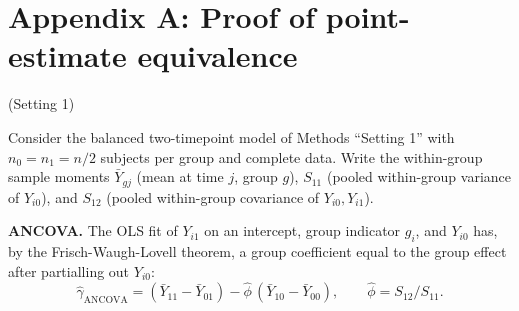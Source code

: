 \documentclass[
  11pt,
]{article}
\begin{document}
\section{Appendix A: Proof of point-estimate equivalence}\label{appendix-a-proof-of-point-estimate-equivalence}

(Setting 1)

Consider the balanced two-timepoint model of Methods
``Setting 1'' with \(n_0 = n_1 = n/2\) subjects per group and
complete data. Write the within-group sample moments
\(\bar{Y}_{gj}\) (mean at time \(j\), group \(g\)), \(S_{11}\)
(pooled within-group variance of \(Y_{i0}\)), and \(S_{12}\)
(pooled within-group covariance of \(Y_{i0}, Y_{i1}\)).

\textbf{ANCOVA.} The OLS fit of \(Y_{i1}\) on an intercept,
group indicator \(g_i\), and \(Y_{i0}\) has, by the
Frisch-Waugh-Lovell theorem, a group coefficient equal to
the group effect after partialling out \(Y_{i0}\):
\[
\hat{\gamma}_{\mathrm{ANCOVA}} =
(\bar{Y}_{11} - \bar{Y}_{01}) -
\hat{\phi}\,(\bar{Y}_{10} - \bar{Y}_{00}), \qquad
\hat{\phi} = S_{12} / S_{11}.
\]
\end{document}
